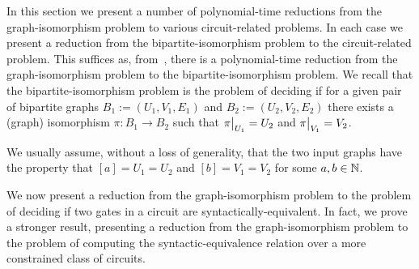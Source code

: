 \documentclass[../paper.tex]{subfiles}
\begin{document}
\begin{remark}
  In this section we present a number of polynomial-time reductions from the
  graph-isomorphism problem to various circuit-related problems. In each case we
  present a reduction from the bipartite-isomorphism problem to the
  circuit-related problem. This suffices as, from~\cite{Zemlyachenko1985}, there
  is a polynomial-time reduction from the graph-isomorphism problem to the
  bipartite-isomorphism problem. We recall that the bipartite-isomorphism
  problem is the problem of deciding if for a given pair of bipartite graphs
  $B_1 := (U_1, V_1, E_1)$ and $B_2 := (U_2, V_2, E_2)$ there exists a (graph)
  isomorphism $\pi : B_1 \rightarrow B_2$ such that $\restr{\pi}{U_1} = U_2$ and
  $\restr{\pi}{V_1} = V_2$.

  We usually assume, without a loss of generality, that the two input graphs
  have the property that $[a] = U_1 = U_2$ and $[b] = V_1 = V_2$ for some $a,b
  \in \mathbb{N}$.
\end{remark}

We now present a reduction from the graph-isomorphism problem to the problem of
deciding if two gates in a circuit are syntactically-equivalent. In fact, we
prove a stronger result, presenting a reduction from the graph-isomorphism
problem to the problem of computing the syntactic-equivalence relation over a
more constrained class of circuits.
\end{document}
